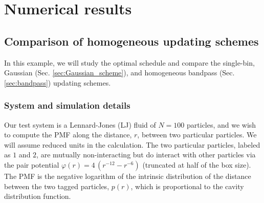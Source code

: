 \documentclass[preprint, superscriptaddress, floatfix]{revtex4-1}
\begin{document}
\section{\label{sec:results}
Numerical results}



\subsection{\label{sec:lj}
Comparison of homogeneous updating schemes}

In this example, we will study the optimal schedule
and compare the single-bin,
Gaussian (Sec. \ref{sec:Gaussian_scheme}),
and homogeneous bandpass (Sec. \ref{sec:bandpass})
updating schemes.

\subsubsection{System and simulation details}

Our test system is
a Lennard-Jones (LJ) fluid of $N = 100$ particles,
and we wish to compute the PMF along
the distance, $r$, between two particular particles.
%
We will assume reduced units in the calculation.
%
The two particular particles, labeled as $1$ and $2$,
are mutually non-interacting
but do interact with other particles
via the pair potential $\varphi(r) = 4 \, \left(r^{-12} - r^{-6}\right)$
(truncated at half of the box size).
%
The PMF is the negative logarithm of
the intrinsic distribution of the distance
between the two tagged particles, $p(r)$,
which is proportional to the cavity distribution function\cite{hansen}.
%
\end{document}
